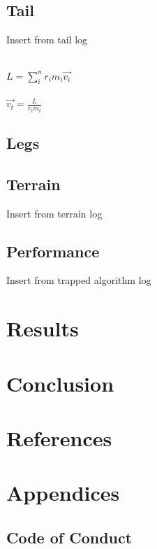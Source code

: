 \documentclass{article}
\begin{document}
\subsection{Tail}
Insert from tail log\\
\begin{Large}\\
$L = \sum^{n}_{i} r_{i}m_{i}\overrightarrow{v_{i}}$\\\\
$\overrightarrow{v_{t}} = \frac{L}{r_{t}m_{t}}$
\end{Large}

\subsection{Legs}
\subsection{Terrain}
Insert from terrain log
\subsection{Performance}
Insert from trapped algorithm log


\newpage
\section{Results}

\newpage
\section{Conclusion}

\newpage
\section{References}

\newpage
\section{Appendices}
\subsection{Code of Conduct}
\end{document}
